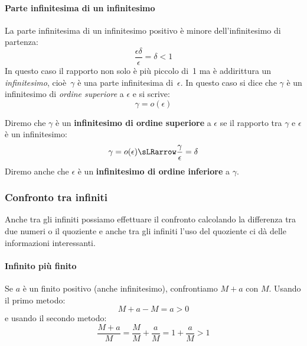 \paragraph{Parte infinitesima di un infinitesimo}
La parte infinitesima di un infinitesimo positivo è minore 
dell'infinitesimo di partenza:
\[\frac{\epsilon \delta}{\epsilon} = \delta < 1\]
In questo caso il rapporto non solo è più piccolo di~1 ma è addirittura un 
\emph{infinitesimo}, 
cioè~\(\gamma\) è una parte infinitesima di~\(\epsilon\). 
In questo caso 
si dice che \(\gamma\) è un infinitesimo di \emph{ordine superiore} a 
\(\epsilon\) e si scrive:
\[\gamma=o(\epsilon)\]
\begin{definizione}
 Diremo che \(\gamma\) è un \textbf{infinitesimo di ordine superiore} a 
\(\epsilon\) se il rapporto tra \(\gamma\) e \(\epsilon\) è un infinitesimo:
\[\gamma=o(\epsilon) \sLRarrow \frac{\gamma}{\epsilon}=\delta\]
Diremo anche che 
\(\epsilon\) è un \textbf{infinitesimo di ordine inferiore} a \(\gamma\).
\end{definizione}

\subsubsection{Confronto tra infiniti}
\label{subsubsec:insnum_confrontoreali}

Anche tra gli infiniti possiamo effettuare il confronto calcolando la 
differenza tra due numeri o il quoziente e anche tra gli infiniti l'uso del 
quoziente ci dà delle informazioni interessanti.


\paragraph{Infinito più finito}
Se \(a\) è un finito positivo (anche infinitesimo), confrontiamo \(M+a\) 
con \(M\). 
Usando il primo metodo:
\[M+a-M = a > 0\]
e usando il secondo metodo: 
\[\frac{M+a}{M} =
  \frac{M}{M} + \frac{a}{M} = 
  1 + \frac{a}{M} > 1\]
